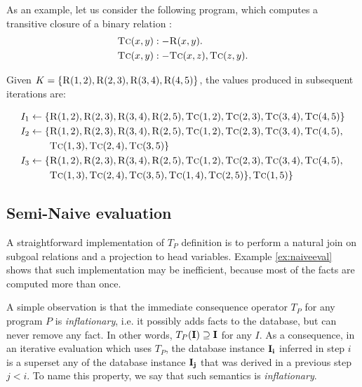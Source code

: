 \begin{exmp}
As an example, let us consider the following program, which computes a transitive closure of a binary relation :
\begin{align}
\textsc{Tc}(x, y) &:- \textsc{R}(x, y).\\
\textsc{Tc}(x, y) &:- \textsc{Tc}(x, z), \textsc{Tc}(z, y).
\end{align}

Given $K = \{\textsc{R}(1, 2), \textsc{R}(2, 3), \textsc{R}(3, 4), \textsc{R}(4, 5)\}$, the values produced in subsequent iterations are:

\begin{align*}
I_1 \leftarrow \{&\textsc{R}(1, 2), \textsc{R}(2, 3), \textsc{R}(3, 4), \textsc{R}(2, 5), \textsc{Tc}(1, 2), \textsc{Tc}(2, 3), \textsc{Tc}(3, 4), \textsc{Tc}(4, 5)\}\\
I_2 \leftarrow \{&\textsc{R}(1, 2), \textsc{R}(2, 3), \textsc{R}(3, 4), \textsc{R}(2, 5), \textsc{Tc}(1, 2), \textsc{Tc}(2, 3), \textsc{Tc}(3, 4), \textsc{Tc}(4, 5), \\
&\textsc{Tc}(1, 3), \textsc{Tc}(2, 4), \textsc{Tc}(3, 5)\}\\
I_3 \leftarrow \{&\textsc{R}(1, 2), \textsc{R}(2, 3), \textsc{R}(3, 4), \textsc{R}(2, 5), \textsc{Tc}(1, 2), \textsc{Tc}(2, 3), \textsc{Tc}(3, 4), \textsc{Tc}(4, 5),\\
& \textsc{Tc}(1, 3), \textsc{Tc}(2, 4), \textsc{Tc}(3, 5), \textsc{Tc}(1, 4), \textsc{Tc}(2, 5)\}, \textsc{Tc}(1, 5)\}\\
\end{align*}
\label{ex:naiveeval}
\end{exmp}

\subsection{Semi-Naive evaluation}\label{ss:seminaiveevaldatalog}
A straightforward implementation of $T_P$ definition is to perform a natural join on subgoal relations and a projection to head variables. Example \ref{ex:naiveeval} shows that such implementation may be inefficient, because most of the facts are computed more than once.

A simple observation is that the immediate consequence operator $T_P$ for any program $P$ is \emph{inflationary}, i.e. it possibly adds facts to the database, but can never remove any fact. In other words, $T_P(\bf{I}) \supseteq \bf{I}$ for any $I$. As a consequence, in an iterative evaluation which uses $T_P$, the database instance $\bf{I}_i$ inferred in step $i$ is a superset any of the database instance $\bf{I}_j$ that was derived in a previous step $j < i$. To name this property, we say that such semantics is \emph{inflationary}.

